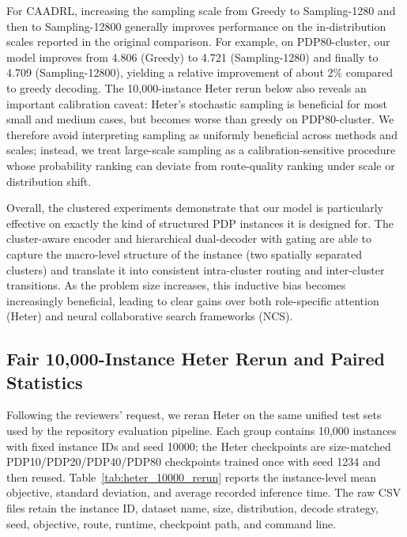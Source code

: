 \documentclass[pdflatex,sn-basic,Numbered]{sn-jnl}
\begin{document}
For CAADRL, increasing the sampling scale from Greedy to Sampling-1280 and then to Sampling-12800 generally improves performance on the in-distribution scales reported in the original comparison. For example, on PDP80-cluster, our model improves from 4.806 (Greedy) to 4.721 (Sampling-1280) and finally to 4.709 (Sampling-12800), yielding a relative improvement of about $2\%$ compared to greedy decoding. The 10,000-instance Heter rerun below also reveals an important calibration caveat: Heter's stochastic sampling is beneficial for most small and medium cases, but becomes worse than greedy on PDP80-cluster. We therefore avoid interpreting sampling as uniformly beneficial across methods and scales; instead, we treat large-scale sampling as a calibration-sensitive procedure whose probability ranking can deviate from route-quality ranking under scale or distribution shift.

Overall, the clustered experiments demonstrate that our model is particularly effective on exactly the kind of structured PDP instances it is designed for. The cluster-aware encoder and hierarchical dual-decoder with gating are able to capture the macro-level structure of the instance (two spatially separated clusters) and translate it into consistent intra-cluster routing and inter-cluster transitions. As the problem size increases, this inductive bias becomes increasingly beneficial, leading to clear gains over both role-specific attention (Heter) and neural collaborative search frameworks (NCS).

\subsection{Fair 10,000-Instance Heter Rerun and Paired Statistics}

Following the reviewers' request, we reran Heter on the same unified test sets used by the repository evaluation pipeline. Each group contains 10,000 instances with fixed instance IDs and seed 10000; the Heter checkpoints are size-matched PDP10/PDP20/PDP40/PDP80 checkpoints trained once with seed 1234 and then reused. Table~\ref{tab:heter_10000_rerun} reports the instance-level mean objective, standard deviation, and average recorded inference time. The raw CSV files retain the instance ID, dataset name, size, distribution, decode strategy, seed, objective, route, runtime, checkpoint path, and command line.

\begin{table}[t]
\centering
\caption{Heter rerun on unified 10,000-instance PDP test sets. Lower objective is better.}
\label{tab:heter_10000_rerun}
\resizebox{\textwidth}{!}{}
\end{table}
\end{document}
